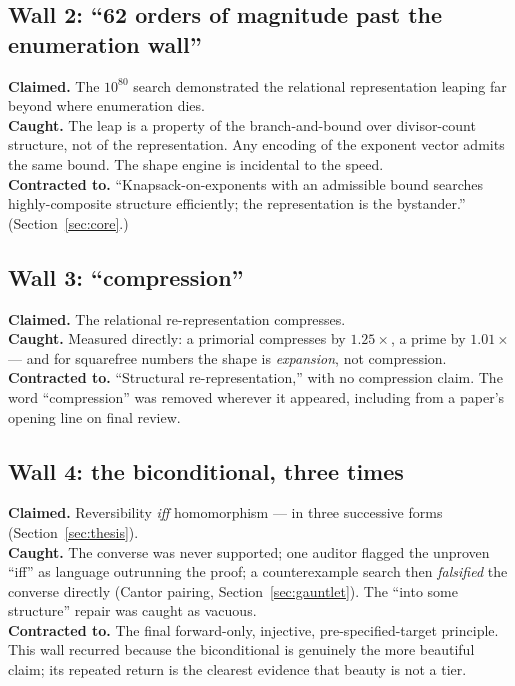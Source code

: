 \documentclass[11pt,a4paper]{article}
\theoremstyle{definition}
\theoremstyle{plain}
\begin{document}
\subsection{Wall 2: ``62 orders of magnitude past the enumeration wall''}
\textbf{Claimed.} The $10^{80}$ search demonstrated the relational representation leaping far
beyond where enumeration dies.\\
\textbf{Caught.} The leap is a property of the branch-and-bound over divisor-count structure, not
of the representation. Any encoding of the exponent vector admits the same bound. The shape engine
is incidental to the speed.\\
\textbf{Contracted to.} ``Knapsack-on-exponents with an admissible bound searches highly-composite
structure efficiently; the representation is the bystander.'' (Section~\ref{sec:core}.)

\subsection{Wall 3: ``compression''}
\textbf{Claimed.} The relational re-representation compresses.\\
\textbf{Caught.} Measured directly: a primorial compresses by $1.25\times$, a prime by
$1.01\times$ --- and for squarefree numbers the shape is \emph{expansion}, not compression.\\
\textbf{Contracted to.} ``Structural re-representation,'' with no compression claim. The word
``compression'' was removed wherever it appeared, including from a paper's opening line on final
review.

\subsection{Wall 4: the biconditional, three times}
\textbf{Claimed.} Reversibility \emph{iff} homomorphism --- in three successive forms
(Section~\ref{sec:thesis}).\\
\textbf{Caught.} The converse was never supported; one auditor flagged the unproven ``iff'' as
language outrunning the proof; a counterexample search then \emph{falsified} the converse directly
(Cantor pairing, Section~\ref{sec:gauntlet}). The ``into some structure'' repair was caught as
vacuous.\\
\textbf{Contracted to.} The final forward-only, injective, pre-specified-target principle. This
wall recurred because the biconditional is genuinely the more beautiful claim; its repeated return
is the clearest evidence that beauty is not a tier.
\end{document}
